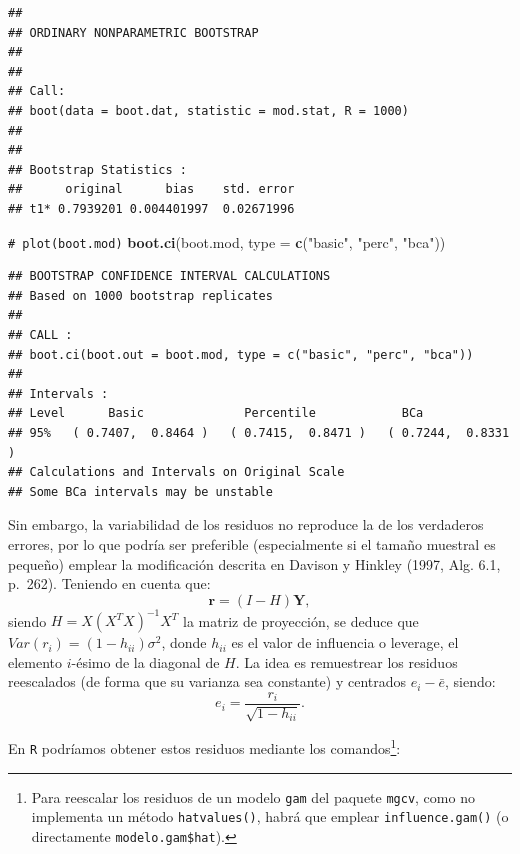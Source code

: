 \documentclass[
]{book}
\newenvironment{Shaded}{\begin{snugshade}}{\end{snugshade}}
\newcommand{\AttributeTok}[1]{\textcolor[rgb]{0.13,0.29,0.53}{#1}}
\newcommand{\CommentTok}[1]{\textcolor[rgb]{0.56,0.35,0.01}{\textit{#1}}}
\newcommand{\DecValTok}[1]{\textcolor[rgb]{0.00,0.00,0.81}{#1}}
\newcommand{\FunctionTok}[1]{\textcolor[rgb]{0.13,0.29,0.53}{\textbf{#1}}}
\newcommand{\NormalTok}[1]{#1}
\newcommand{\OtherTok}[1]{\textcolor[rgb]{0.56,0.35,0.01}{#1}}
\newcommand{\SpecialCharTok}[1]{\textcolor[rgb]{0.81,0.36,0.00}{\textbf{#1}}}
\newcommand{\StringTok}[1]{\textcolor[rgb]{0.31,0.60,0.02}{#1}}
\renewcommand{\mathbf}[1]{\symbf{#1}}
\theoremstyle{break}
\theoremstyle{nonumberplain}
\renewcommand{\CommentTok}[1]{\textcolor[rgb]{0.41,0.41,0.41}{\texttt{#1}}}
\let\oldfootnote\footnote
\renewcommand\footnote[1]{\oldfootnote{\hspace{2mm}#1}}
\begin{document}
\begin{verbatim}
## 
## ORDINARY NONPARAMETRIC BOOTSTRAP
## 
## 
## Call:
## boot(data = boot.dat, statistic = mod.stat, R = 1000)
## 
## 
## Bootstrap Statistics :
##      original      bias    std. error
## t1* 0.7939201 0.004401997  0.02671996
\end{verbatim}

\begin{Shaded}
\begin{Highlighting}[]
\CommentTok{\# plot(boot.mod)}
\FunctionTok{boot.ci}\NormalTok{(boot.mod, }\AttributeTok{type =} \FunctionTok{c}\NormalTok{(}\StringTok{"basic"}\NormalTok{, }\StringTok{"perc"}\NormalTok{, }\StringTok{"bca"}\NormalTok{))}
\end{Highlighting}
\end{Shaded}

\begin{verbatim}
## BOOTSTRAP CONFIDENCE INTERVAL CALCULATIONS
## Based on 1000 bootstrap replicates
## 
## CALL : 
## boot.ci(boot.out = boot.mod, type = c("basic", "perc", "bca"))
## 
## Intervals : 
## Level      Basic              Percentile            BCa          
## 95%   ( 0.7407,  0.8464 )   ( 0.7415,  0.8471 )   ( 0.7244,  0.8331 )  
## Calculations and Intervals on Original Scale
## Some BCa intervals may be unstable
\end{verbatim}

Sin embargo, la variabilidad de los residuos no reproduce la de los verdaderos errores, por lo que podría ser preferible (especialmente si el tamaño muestral es pequeño) emplear la modificación descrita en Davison y Hinkley (1997, Alg. 6.1, p.~262).
Teniendo en cuenta que:
\[\mathbf{r} = \left( I - H \right)\mathbf{Y},\]
siendo \(H = X\left( X^{T}X\right)^{-1}X^{T}\) la matriz de proyección, se deduce que \(Var(r_i) = (1 - h_{ii})\sigma^2\), donde \(h_{ii}\) es el valor de influencia o leverage, el elemento \(i\)-ésimo de la diagonal de \(H\).
La idea es remuestrear los residuos reescalados (de forma que su varianza sea constante) y centrados \(e_i - \bar{e}\), siendo:
\[e_i = \frac{r_i}{\sqrt{1 - h_{ii}}}.\]

En \texttt{R} podríamos obtener estos residuos mediante los comandos\footnote{Para reescalar los
  residuos de un modelo \texttt{gam} del paquete \texttt{mgcv}, como no implementa un método \texttt{hatvalues()},
  habrá que emplear \texttt{influence.gam()} (o directamente \texttt{modelo.gam\$hat}).}:

\begin{Shaded}
\end{Shaded}
\end{document}
